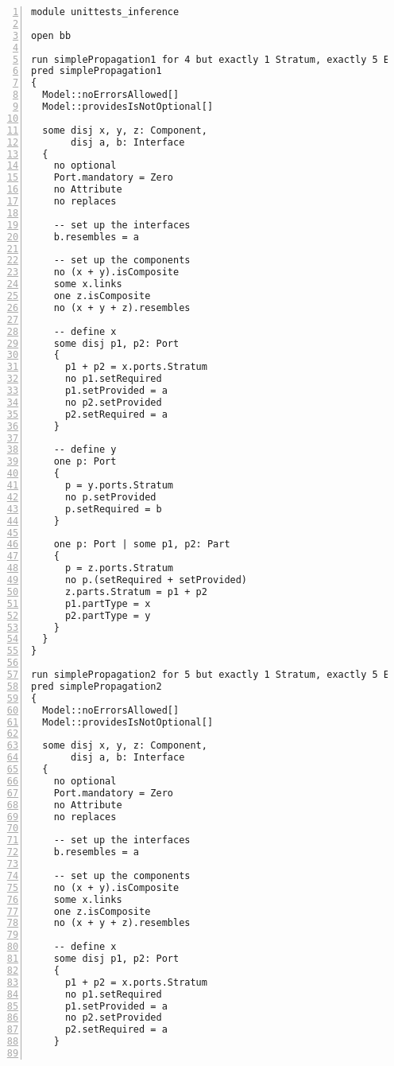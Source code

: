 \lstset{frame=tb, aboveskip=12pt, belowskip=-3pt, breaklines=true, tabsize=2, mathescape=true}
\begin{lstlisting}[caption={unittests\_inference.als}, numbers=left]
module unittests_inference

open bb

run simplePropagation1 for 4 but exactly 1 Stratum, exactly 5 Element, exactly 4 Port, exactly 2 Part, exactly 3 Component, exactly 2 Interface, exactly 2 Connector, 7 LinkEnd
pred simplePropagation1
{
  Model::noErrorsAllowed[]
  Model::providesIsNotOptional[]

  some disj x, y, z: Component,
       disj a, b: Interface
  {
    no optional
    Port.mandatory = Zero
    no Attribute
    no replaces
  
    -- set up the interfaces
    b.resembles = a
  
    -- set up the components
    no (x + y).isComposite
    some x.links
    one z.isComposite
    no (x + y + z).resembles
    
    -- define x
    some disj p1, p2: Port
    {
      p1 + p2 = x.ports.Stratum
      no p1.setRequired
      p1.setProvided = a
      no p2.setProvided
      p2.setRequired = a
    }
    
    -- define y
    one p: Port
    {
      p = y.ports.Stratum
      no p.setProvided
      p.setRequired = b
    }
    
    one p: Port | some p1, p2: Part
    {
      p = z.ports.Stratum
      no p.(setRequired + setProvided)
      z.parts.Stratum = p1 + p2
      p1.partType = x
      p2.partType = y
    }
  }
}

run simplePropagation2 for 5 but exactly 1 Stratum, exactly 5 Element, exactly 4 Port, exactly 3 Part, exactly 3 Component, exactly 2 Interface, exactly 3 Connector, 9 LinkEnd, 6 ConnectorEnd
pred simplePropagation2
{
  Model::noErrorsAllowed[]
  Model::providesIsNotOptional[]

  some disj x, y, z: Component,
       disj a, b: Interface
  {
    no optional
    Port.mandatory = Zero
    no Attribute
    no replaces
  
    -- set up the interfaces
    b.resembles = a
  
    -- set up the components
    no (x + y).isComposite
    some x.links
    one z.isComposite
    no (x + y + z).resembles
    
    -- define x
    some disj p1, p2: Port
    {
      p1 + p2 = x.ports.Stratum
      no p1.setRequired
      p1.setProvided = a
      no p2.setProvided
      p2.setRequired = a
    }
    

\end{lstlisting}

